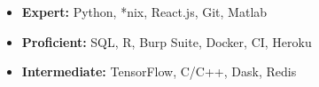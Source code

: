 \begin{cventries}
    \begin{itemize}
        \item \textbf{Expert:} Python, *nix, React.js, Git, Matlab
        \item \textbf{Proficient:} SQL, R, Burp Suite, Docker, CI, Heroku
        \item \textbf{Intermediate:} TensorFlow, C/C++, Dask, Redis
    \end{itemize}
\end{cventries}
